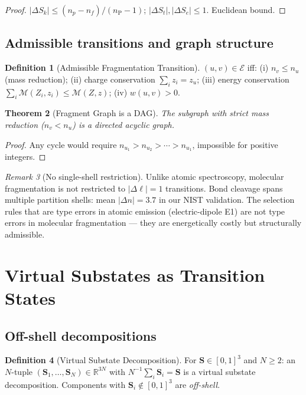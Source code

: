\documentclass[twocolumn,10pt,a4paper]{article}
\theoremstyle{thmstyle}
\newtheorem{theorem}{Theorem}[section]
\theoremstyle{definition}
\newtheorem{definition}[theorem]{Definition}
\theoremstyle{remark}
\newtheorem{remark}[theorem]{Remark}
\newcommand{\R}{\mathbb{R}}
\newcommand{\nP}{n_{\mathrm{P}}}
\newcommand{\Sv}{\mathbf{S}}
\newcommand{\Sk}{S_{k}}
\newcommand{\St}{S_{t}}
\newcommand{\Se}{S_{e}}
\newcommand{\Mop}{\mathcal{M}}
\newcommand{\calE}{\mathcal{E}}
\begin{document}
\begin{proof}
$|\Delta\Sk| \leq (n_p - n_f)/(\nP-1)$; $|\Delta\St|, |\Delta\Se| \leq 1$.
Euclidean bound.
\end{proof}

\subsection{Admissible transitions and graph structure}

\begin{definition}[Admissible Fragmentation Transition]
$(u, v) \in \calE$ iff: (i) $n_v \leq n_u$ (mass reduction);
(ii) charge conservation $\sum_i z_i = z_u$;
(iii) energy conservation $\sum_i \Mop(Z_i,z_i) \leq \Mop(Z,z)$;
(iv) $w(u,v) > 0$.
\end{definition}

\begin{theorem}[Fragment Graph is a DAG]
The subgraph with strict mass reduction ($n_v < n_u$) is a directed
acyclic graph.
\end{theorem}

\begin{proof}
Any cycle would require $n_{u_1} > n_{u_2} > \cdots > n_{u_1}$, impossible
for positive integers.
\end{proof}

\begin{remark}[No single-shell restriction]
Unlike atomic spectroscopy, molecular fragmentation is not restricted to
$|\Delta\ell| = 1$ transitions. Bond cleavage spans multiple partition shells:
mean $|\Delta n| = 3.7$ in our NIST validation. The selection rules that are
type errors in atomic emission (electric-dipole E1) are not type errors in
molecular fragmentation — they are energetically costly but structurally
admissible.
\end{remark}

\section{Virtual Substates as Transition States}
\label{sec:virtual}

\subsection{Off-shell decompositions}

\begin{definition}[Virtual Substate Decomposition]
For $\Sv \in [0,1]^3$ and $N \geq 2$: an $N$-tuple
$(\Sv_1,\ldots,\Sv_N) \in \R^{3N}$ with
$N^{-1}\sum_i \Sv_i = \Sv$ is a virtual substate decomposition.
Components with $\Sv_i \notin [0,1]^3$ are \emph{off-shell}.
\end{definition}
\end{document}
